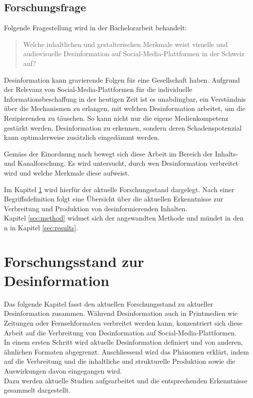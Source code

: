 \documentclass[12pt,a4paper]{article}        %
\begin{document}
\subsection{Forschungsfrage}
\label{thesis}
Folgende Fragestellung wird in der Bachelorarbeit behandelt:
\begin{quote}
  Welche inhaltlichen und gestalterischen Merkmale weist visuelle und audiovisuelle Desinformation auf Social-Media-Plattformen in der Schweiz auf?
\end{quote}
Desinformation kann gravierende Folgen für eine Gesellschaft haben.
Aufgrund der Relevanz von Social-Media-Plattformen für die individuelle Informationsbeschaffung in der heutigen Zeit ist es unabdingbar, ein Verständnis über die Mechanismen zu erlangen, mit welchen Desinformation arbeitet, um die Rezipierenden zu täuschen. So kann nicht nur die eigene Medienkompetenz gestärkt werden, Desinformation zu erkennen, sondern deren Schadenspotenzial kann optimalerweise zusätzlich eingedämmt werden.

Gemäss der Einordnung nach \cite[37]{lasswell_lasswell_1948} bewegt sich diese Arbeit im Bereich der Inhalts- und Kanalforschung. Es wird untersucht, durch wen Desinformation verbreitet wird und welche Merkmale diese aufweist.

\label{structure}
Im Kapitel \ref{sec:theory}  wird hierfür der aktuelle Forschungsstand dargelegt. Nach einer Begriffsdefinition folgt eine Übersicht über die aktuellen Erkenntnisse zur Verbreitung und Produktion von desinformierenden Inhalten. \\
Kapitel \ref{sec:method}  widmet sich der angewandten Methode und mündet in den n in Kapitel \ref{sec:results}.

\pagebreak
\section{Forschungsstand zur Desinformation}
\label{sec:theory}
Das folgende Kapitel fasst den aktuellen Forschungsstand zu aktueller Desinformation zusammen. Während Desinformation auch in Printmedien wie Zeitungen oder Fernsehformaten verbreitet werden kann, konzentriert sich diese Arbeit auf die Verbreitung von Desinformation auf Social-Media-Plattformen.\\
In einem ersten Schritt wird aktuelle Desinformation definiert und von anderen, ähnlichen Formaten abgegrenzt. Anschliessend wird das Phänomen erklärt, indem auf die Verbreitung und die inhaltliche und strukturelle Produktion sowie die Auswirkungen davon eingegangen wird. \\
Dazu werden aktuelle Studien aufgearbeitet und die entsprechenden Erkenntnisse gesammelt dargestellt.
\end{document}
